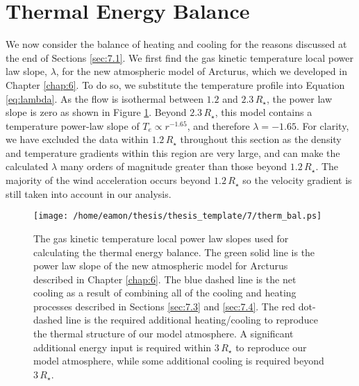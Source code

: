 \section{Thermal Energy Balance}\label{sec:7.5}
We now consider the balance of heating and cooling for the reasons discussed at the end of Sections \ref{sec:7.1}.
We first find the gas kinetic temperature local power law slope, $\lambda$, for the new atmospheric model of Arcturus, which we developed in Chapter \ref{chap:6}. To do so, we substitute the temperature profile into Equation \ref{eq:lambda}. As the flow is isothermal between $1.2$ and $2.3\,R_{\star}$, the power law slope is zero as shown in Figure \ref{fig:7.6}. Beyond $2.3\,R_{\star}$, this model contains a temperature power-law slope of $T_e \propto r^{-1.65}$, and therefore $\lambda = -1.65$. For clarity, we have excluded the data within $1.2\,R_{\star}$ throughout this section as the density and temperature gradients within this region are very large, and can make the calculated $\lambda$ many orders of magnitude greater than those beyond $1.2\,R_{\star}$. The majority of the wind acceleration occurs beyond $1.2\,R_{\star}$ so the velocity gradient is still taken into account in our analysis.

\begin{figure}[!ht]
\centering 
         \texttt{[image: /home/eamon/thesis/thesis\_template/7/therm\_bal.ps]}
\caption[Net thermal balance]{The gas kinetic temperature local power law slopes used for calculating the thermal energy balance. The green solid line is the power law slope of the new atmospheric model for Arcturus described in Chapter \ref{chap:6}. The blue dashed line is the net cooling as a result of combining all of the cooling and heating processes described in Sections \ref{sec:7.3} and \ref{sec:7.4}. The red dot-dashed line is the required additional heating/cooling to reproduce the thermal structure of our model atmosphere. A significant additional energy input is required within $3\,R_{\star}$ to reproduce our model atmosphere, while some additional cooling is required beyond $3\,R_{\star}$. }
\label{fig:7.6}
\end{figure}

